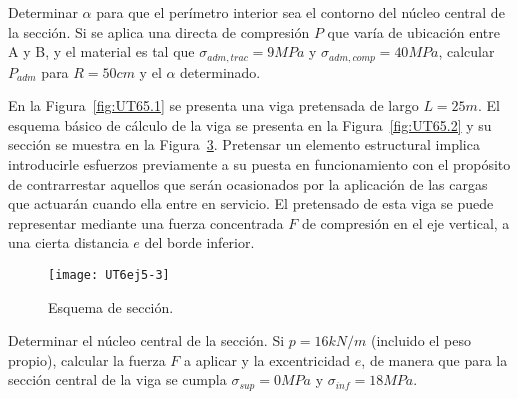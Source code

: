 \begin{figure}[htb]
	\centering
{}
\hspace{0.1\textwidth}
\caption{}
	\label{fig:UT64}
\end{figure}

\parte Determinar $\alpha$ para que el perímetro interior sea el contorno del núcleo central de la sección.
\parte Si se aplica una directa de compresión $P$ que varía de ubicación entre A y B, y el material es tal que $\sigma_{adm,trac}=9MPa$ y $\sigma_{adm,comp}=40MPa$, calcular $P_{adm}$ para $R=50cm$ y el $\alpha$ determinado.

\ejercicio 

En la Figura~\ref{fig:UT65.1} se presenta una viga pretensada de largo $L=25m$. El esquema básico de cálculo de la viga se presenta en la Figura~\ref{fig:UT65.2} y su sección se muestra en la Figura~\ref{fig:UT65.3}. Pretensar un elemento estructural implica introducirle esfuerzos previamente a su puesta en funcionamiento con el propósito de contrarrestar aquellos que serán ocasionados por la aplicación de las cargas que actuarán cuando ella entre en servicio. El pretensado de esta viga se puede representar mediante una fuerza concentrada $F$ de compresión en el eje vertical, a una cierta distancia $e$ del borde inferior.

\begin{figure}[htb]
	\centering
{}
\hspace{0.1\textwidth}
\caption{}
	\label{fig:UT65}
\end{figure}
\begin{figure}[htb]
	\centering
	\texttt{[image: UT6ej5-3]}
	\caption{Esquema de sección.}
	\label{fig:UT65.3}
\end{figure}

\parte Determinar el núcleo central de la sección.
\parte Si $p=16 kN/m$ (incluido el peso propio), calcular la fuerza $F$ a aplicar y la excentricidad $e$, de manera que para la sección central de la viga se cumpla $\sigma_{sup}=0MPa$ y $\sigma_{inf}=18MPa$.

\ejercicio 

